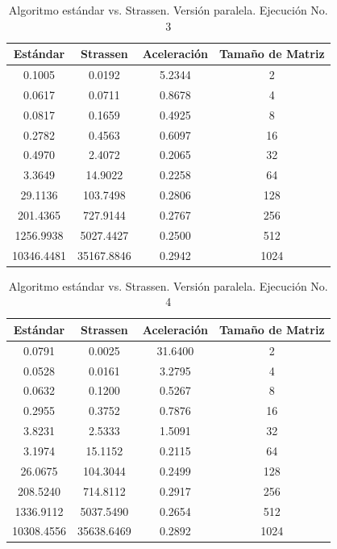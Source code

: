 \documentclass{article}
\begin{document}
\begin{table}[ht]
\centering
\begin{tabular}{|c|c|c|c|}
\hline
\textbf{Estándar} & \textbf{Strassen} & \textbf{Aceleración} & \textbf{Tamaño de Matriz} \\
\hline
0.1005 & 0.0192 & 5.2344 & 2 \\
0.0617 & 0.0711 & 0.8678 & 4 \\
0.0817 & 0.1659 & 0.4925 & 8 \\
0.2782 & 0.4563 & 0.6097 & 16 \\
0.4970 & 2.4072 & 0.2065 & 32 \\
3.3649 & 14.9022 & 0.2258 & 64 \\
29.1136 & 103.7498 & 0.2806 & 128 \\
201.4365 & 727.9144 & 0.2767 & 256 \\
1256.9938 & 5027.4427 & 0.2500 & 512 \\
10346.4481 & 35167.8846 & 0.2942 & 1024 \\
\hline
\end{tabular}
\caption{Algoritmo estándar vs. Strassen. Versión paralela. Ejecución No. 3}
\end{table}

\begin{table}[ht]
\centering
\begin{tabular}{|c|c|c|c|}
\hline
\textbf{Estándar} & \textbf{Strassen} & \textbf{Aceleración} & \textbf{Tamaño de Matriz} \\
\hline
0.0791 & 0.0025 & 31.6400 & 2 \\
0.0528 & 0.0161 & 3.2795 & 4 \\
0.0632 & 0.1200 & 0.5267 & 8 \\
0.2955 & 0.3752 & 0.7876 & 16 \\
3.8231 & 2.5333 & 1.5091 & 32 \\
3.1974 & 15.1152 & 0.2115 & 64 \\
26.0675 & 104.3044 & 0.2499 & 128 \\
208.5240 & 714.8112 & 0.2917 & 256 \\
1336.9112 & 5037.5490 & 0.2654 & 512 \\
10308.4556 & 35638.6469 & 0.2892 & 1024 \\
\hline
\end{tabular}
\caption{Algoritmo estándar vs. Strassen. Versión paralela. Ejecución No. 4}
\end{table}
\end{document}
